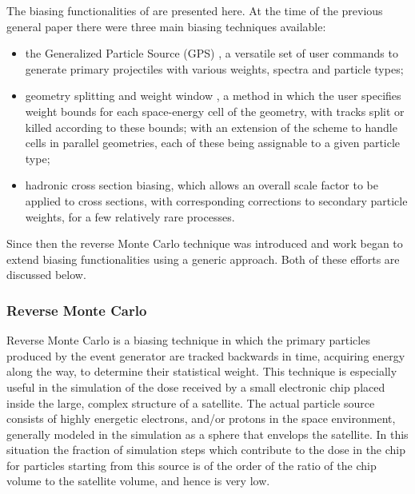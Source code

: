 The biasing functionalities of \Gfour{} are presented here.  At the time of the 
previous \Gfour{} general paper \cite{bib:generalpaper2} there were three main 
biasing techniques available:
\begin{itemize}
\item the Generalized Particle Source (GPS) \cite{bib:AppDevGuide}, a versatile
      set of user commands to generate primary projectiles with various weights,
      spectra and particle types; 
\item geometry splitting and weight window \cite{bib:AppDevGuide}, a method in 
      which the user specifies weight bounds for each space-energy cell of the 
      geometry, with tracks split or killed according to these bounds;
      with an extension of the scheme \cite{detmodeling:parGeom} to handle
      cells in parallel geometries, each of these being assignable to a given
      particle type;
\item hadronic cross section biasing, which allows an overall scale factor to be
      applied to cross sections, with corresponding corrections to secondary 
      particle weights, for a few relatively rare processes. 
\end{itemize}

Since then the reverse Monte Carlo technique was introduced and work began to
extend biasing functionalities using a generic approach.  Both of these efforts
are discussed below.

\subsubsection{Reverse Monte Carlo}
Reverse Monte Carlo is a biasing technique in which the primary particles 
produced by the event generator are tracked backwards in time, acquiring 
energy along the way, to determine their statistical weight.  This technique is
especially useful in the simulation of the dose received by a small electronic
chip placed inside the large, complex structure of a satellite.  The actual 
particle source consists of highly energetic electrons, and/or protons in the 
space environment, generally modeled in the simulation as a sphere that envelops
the satellite.  In this situation the fraction of simulation steps which 
contribute to the dose in the chip for particles starting from this source is of
the order of the ratio of the chip volume to the satellite volume, and hence is
very low.

